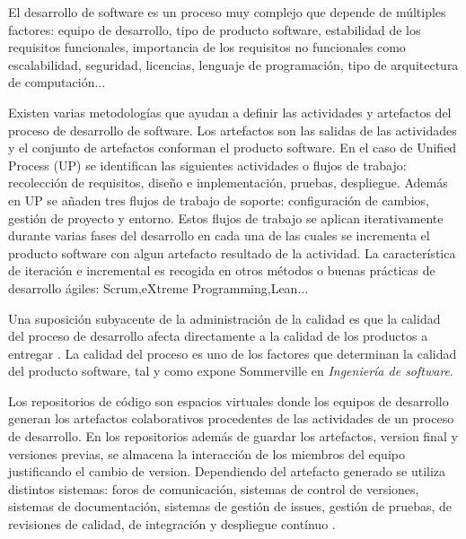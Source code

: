 

El desarrollo de software es un proceso muy complejo que depende de múltiples factores: equipo de desarrollo, tipo de producto software, estabilidad de los requisitos funcionales, importancia de los requisitos no funcionales como escalabilidad, seguridad, licencias, lenguaje de programación, tipo de arquitectura de computación...

Existen varias metodologías que ayudan a definir las actividades y artefactos del proceso de desarrollo de software. Los artefactos son las salidas de las actividades y el conjunto de artefactos conforman el producto software. En el caso de  Unified Process (UP) \cite{jacobson_proceso_2000} se identifican las siguientes actividades o flujos de trabajo: recolección de requisitos, diseño e implementación, pruebas, despliegue. Además en UP se añaden tres flujos de trabajo de soporte: configuración de cambios, gestión de proyecto y entorno. Estos flujos de trabajo se aplican iterativamente durante varias fases del desarrollo en cada una de las cuales se incrementa el producto software con algun artefacto resultado de la actividad. La característica de iteración e incremental es recogida en otros métodos o buenas prácticas de desarrollo ágiles\cite{noauthor_scrum_2019}: 
Scrum,eXtreme Programming,Lean...


Una suposición subyacente de la administración de la calidad es que la calidad del proceso de desarrollo afecta directamente a la calidad de los productos a entregar \citep[pág 543]{sommerville_ingenierisoftware_2002}.
La calidad del proceso es uno de los factores que determinan la calidad del producto software, tal y como expone Sommerville en \textit{Ingeniería de software}\cite{sommerville_ingenierisoftware_2002}.

Los repositorios de código son espacios virtuales donde los equipos de desarrollo generan los artefactos colaborativos procedentes de las actividades de un proceso de desarrollo. En los repositorios además de guardar los artefactos, version final y versiones previas, se almacena la interacción de los miembros del equipo justificando el cambio de version. Dependiendo del artefacto generado se utiliza distintos sistemas: foros de comunicación, sistemas de control de versiones, sistemas de documentación, sistemas de gestión de issues, gestión de pruebas, de revisiones de calidad, de  integración y despliegue contínuo \cite{guemes-pena_emerging_2018}.

